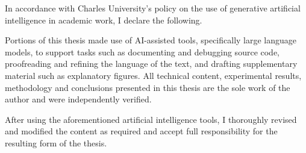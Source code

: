 
In accordance with Charles University's policy on the use of generative
artificial intelligence in academic work, I declare the following.

\medskip
\noindent
Portions of this thesis made use of AI-assisted tools, specifically large
language models, to support tasks such as documenting and debugging source
code, proofreading and refining the language of the text, and drafting
supplementary material such as explanatory figures. All technical content,
experimental results, methodology and conclusions presented in this thesis
are the sole work of the author and were independently verified.

\medskip
\noindent After using the aforementioned artificial intelligence tools, I
thoroughly revised and modified the content as required and accept full
responsibility for the resulting form of the thesis.
